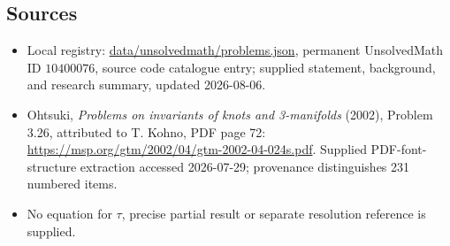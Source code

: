 \documentclass[11pt]{article}
\begin{document}
\subsection{Sources}
\begin{itemize}
\item Local registry: \url{data/unsolvedmath/problems.json}, permanent UnsolvedMath ID \(10400076\), source code catalogue entry; supplied statement, background, and research summary, updated 2026-08-06.
\item Ohtsuki, \emph{Problems on invariants of knots and 3-manifolds} (2002), Problem 3.26, attributed to T. Kohno, PDF page 72: \url{https://msp.org/gtm/2002/04/gtm-2002-04-024s.pdf}. Supplied PDF-font-structure extraction accessed 2026-07-29; provenance distinguishes 231 numbered items.
\item No equation for \(\tau\), precise partial result or separate resolution reference is supplied.
\end{itemize}
\end{document}
